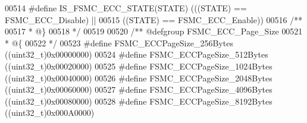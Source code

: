 \begin{DoxyCode}
00514 \textcolor{preprocessor}{#}\textcolor{preprocessor}{define} \textcolor{preprocessor}{IS\_FSMC\_ECC\_STATE}\textcolor{preprocessor}{(}\textcolor{preprocessor}{STATE}\textcolor{preprocessor}{)} \textcolor{preprocessor}{(}\textcolor{preprocessor}{(}\textcolor{preprocessor}{(}\textcolor{preprocessor}{STATE}\textcolor{preprocessor}{)} \textcolor{preprocessor}{==} FSMC_ECC_Disable\textcolor{preprocessor}{)} \textcolor{preprocessor}{||}
00515                                   \textcolor{preprocessor}{(}\textcolor{preprocessor}{(}\textcolor{preprocessor}{STATE}\textcolor{preprocessor}{)} \textcolor{preprocessor}{==} FSMC_ECC_Enable\textcolor{preprocessor}{)}\textcolor{preprocessor}{)}
00516 \textcolor{comment}{/**}
00517 \textcolor{comment}{  * @\}}
00518 \textcolor{comment}{  */}
00519 
00520 \textcolor{comment}{/** @defgroup FSMC\_ECC\_Page\_Size }
00521 \textcolor{comment}{  * @\{}
00522 \textcolor{comment}{  */}
00523 \textcolor{preprocessor}{#}\textcolor{preprocessor}{define} \textcolor{preprocessor}{FSMC\_ECCPageSize\_256Bytes}                \textcolor{preprocessor}{(}\textcolor{preprocessor}{(}\textcolor{preprocessor}{uint32\_t}\textcolor{preprocessor}{)}0x00000000\textcolor{preprocessor}{)}
00524 \textcolor{preprocessor}{#}\textcolor{preprocessor}{define} \textcolor{preprocessor}{FSMC\_ECCPageSize\_512Bytes}                \textcolor{preprocessor}{(}\textcolor{preprocessor}{(}\textcolor{preprocessor}{uint32\_t}\textcolor{preprocessor}{)}0x00020000\textcolor{preprocessor}{)}
00525 \textcolor{preprocessor}{#}\textcolor{preprocessor}{define} \textcolor{preprocessor}{FSMC\_ECCPageSize\_1024Bytes}               \textcolor{preprocessor}{(}\textcolor{preprocessor}{(}\textcolor{preprocessor}{uint32\_t}\textcolor{preprocessor}{)}0x00040000\textcolor{preprocessor}{)}
00526 \textcolor{preprocessor}{#}\textcolor{preprocessor}{define} \textcolor{preprocessor}{FSMC\_ECCPageSize\_2048Bytes}               \textcolor{preprocessor}{(}\textcolor{preprocessor}{(}\textcolor{preprocessor}{uint32\_t}\textcolor{preprocessor}{)}0x00060000\textcolor{preprocessor}{)}
00527 \textcolor{preprocessor}{#}\textcolor{preprocessor}{define} \textcolor{preprocessor}{FSMC\_ECCPageSize\_4096Bytes}               \textcolor{preprocessor}{(}\textcolor{preprocessor}{(}\textcolor{preprocessor}{uint32\_t}\textcolor{preprocessor}{)}0x00080000\textcolor{preprocessor}{)}
00528 \textcolor{preprocessor}{#}\textcolor{preprocessor}{define} \textcolor{preprocessor}{FSMC\_ECCPageSize\_8192Bytes}               \textcolor{preprocessor}{(}\textcolor{preprocessor}{(}\textcolor{preprocessor}{uint32\_t}\textcolor{preprocessor}{)}0x000A0000\textcolor{preprocessor}{)}

\end{DoxyCode}
